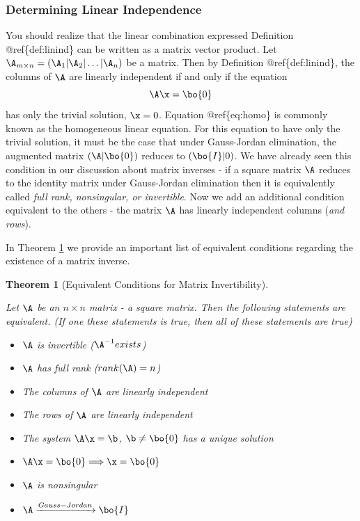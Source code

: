 \documentclass[
]{article}
\providecommand{\tightlist}{%
  \setlength{\itemsep}{0pt}\setlength{\parskip}{0pt}}
\newtheorem{theorem}{Theorem}[section]
\theoremstyle{definition}
\theoremstyle{definition}
\theoremstyle{definition}
\theoremstyle{definition}
\theoremstyle{remark}
\begin{document}
\hypertarget{determining-linear-independence}{%
\subsubsection{Determining Linear Independence}\label{determining-linear-independence}}

You should realize that the linear combination expressed Definition @ref\{def:linind\} can be written as a matrix vector product. Let \(\A_{m\times n} = (\A_1|\A_2|\dots|\A_n)\) be a matrix. Then by Definition @ref\{def:linind\}, the columns of \(\A\) are linearly independent if and only if the equation
\begin{equation}
\A\x = \bo{0}
\label{eq:homo}
\end{equation}
has only the trivial solution, \(\x=0\). Equation @ref\{eq:homo\} is commonly known as the homogeneous linear equation. For this equation to have only the trivial solution, it must be the case that under Gauss-Jordan elimination, the augmented matrix \((\A|\bo{0})\) reduces to \((\bo{I}|0)\). We have already seen this condition in our discussion about matrix inverses - if a square matrix \(\A\) reduces to the identity matrix under Gauss-Jordan elimination then it is equivalently called \emph{full rank, nonsingular, or invertible}. Now we add an additional condition equivalent to the others - the matrix \(\A\) has linearly independent columns (\emph{and rows}).

In Theorem \ref{thm:equivcond} we provide an important list of equivalent conditions regarding the existence of a matrix inverse.

\begin{theorem}[Equivalent Conditions for Matrix Invertibility]
\protect\hypertarget{thm:equivcond}{}\label{thm:equivcond}

Let \(\A\) be an \(n\times n\) matrix - a \emph{square} matrix. Then the following statements are \emph{equivalent}. (If one these statements is true, then all of these statements are true)

\begin{itemize}
\tightlist
\item
  \(\A\) is invertible (\(\A^{-1} exists\))
\item
  \(\A\) has full rank (\(rank(\A)=n\))
\item
  The columns of \(\A\) are linearly independent
\item
  The rows of \(\A\) are linearly independent
\item
  The system \(\A\x=\b\), \(\b\neq \bo{0}\) has a unique solution
\item
  \(\A\x=\bo{0} \Longrightarrow \x=\bo{0}\)
\item
  \(\A\) is nonsingular
\item
  \(\A \xrightarrow{Gauss-Jordan} \bo{I}\)
\end{itemize}

\end{theorem}
\end{document}
